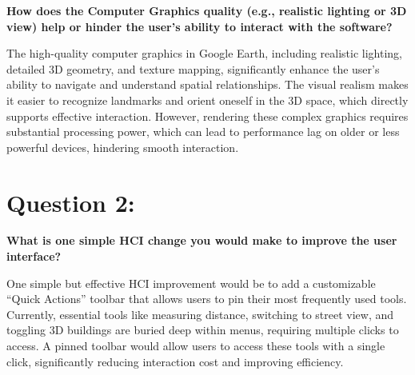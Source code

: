 \documentclass[landscape,12pt,a4paper]{article}
\begin{document}
\textbf{
How does the Computer Graphics quality (e.g., realistic lighting
or 3D view) help or hinder the user's ability to interact with
the software?
}

\vspace{0.12cm}

\justifying

The high-quality computer graphics in Google Earth, including
realistic lighting, detailed 3D geometry, and texture mapping,
significantly enhance the user's ability to navigate and understand
spatial relationships. The visual realism makes it easier to
recognize landmarks and orient oneself in the 3D space, which
directly supports effective interaction. However, rendering these
complex graphics requires substantial processing power, which can
lead to performance lag on older or less powerful devices, hindering
smooth interaction.


\vspace{0.30cm}


\section*{Question 2:}

\textbf{
What is one simple HCI change you would make to improve the
user interface?
}

\vspace{0.12cm}

\justifying

One simple but effective HCI improvement would be to add a
customizable ``Quick Actions'' toolbar that allows users to pin
their most frequently used tools. Currently, essential tools like
measuring distance, switching to street view, and toggling 3D
buildings are buried deep within menus, requiring multiple clicks
to access. A pinned toolbar would allow users to access these tools
with a single click, significantly reducing interaction cost and
improving efficiency.


\vspace{0.30cm}
\end{document}
